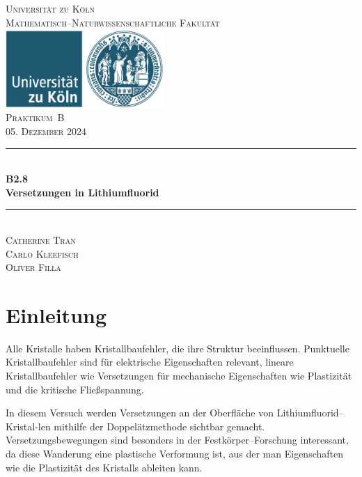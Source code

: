 \documentclass[12pt,a4paper]{scrartcl}
\numberwithin{equation}{section} %
\newcommand{\HRule}{\rule{\linewidth}{0.7mm}}
\begin{document}
\begin{titlepage}
	\pagestyle{empty}

	\begin{center}

	\textsc{\LARGE Universität zu Köln }\\ [0.4cm]
	\textsc{Mathematisch--Naturwissenschaftliche Fakultät} \\[1.5cm]

	\includegraphics[width=0.45\textwidth]{../media/uni.jpg}\\[1.5cm]  %

	\textsc{\Large Praktikum~B}\\[2mm]
	\textsc{05. Dezember 2024}\\[10mm]
	\HRule \\[0.4cm]

		{	\Huge \bfseries B2.8}\\[0.4cm]
			{	\huge \bfseries Versetzungen in Lithiumfluorid}\\[0.3cm]
	
	\HRule \\[3cm]

		\textsc{\Large Catherine Tran } \\[3pt]
		\textsc{\Large Carlo Kleefisch } \\[3pt]
		\textsc{\Large Oliver Filla } \\[3pt]
	\end{center}
\end{titlepage}

\newpage
\tableofcontents
\newpage

\hypertarget{einleitung}{%
\section{Einleitung}\label{einleitung}}

Alle Kristalle haben Kristallbaufehler, die ihre Struktur beeinflussen. Punktuelle Kristallbaufehler sind für elektrische Eigenschaften relevant, lineare Kristallbaufehler wie Versetzungen für mechanische Eigenschaften wie Plastizität und die kritische Fließspannung.

In diesem Versuch werden Versetzungen an der Oberfläche von Lithiumfluorid--Kristal-\newline len mithilfe der Doppelätzmethode sichtbar gemacht. Versetzungsbewegungen sind besonders in der Festkörper--Forschung interessant, da diese Wanderung eine plastische Verformung ist, aus der man Eigenschaften wie die Plastizität des Kristalls ableiten kann.
\end{document}
